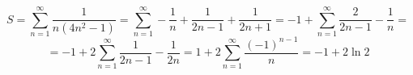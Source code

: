 


	$$S = \sum_{n = 1}^{\infty} \frac{1}{n(4n^2-1)} = \sum_{n = 1}^{\infty} -\frac{1}{n}+\frac{1}{2n-1}+\frac{1}{2n+1} =-1+ \sum_{n = 1}^{\infty} \frac{2}{2n-1}-\frac{1}{n} =$$
	$$= -1+2 \sum_{n = 1}^{\infty} \frac{1}{2n-1}-\frac{1}{2n}= 1+2 \sum_{n = 1}^{\infty} \frac{(-1)^{n-1}}{n} = -1+2 \ln 2$$
	
